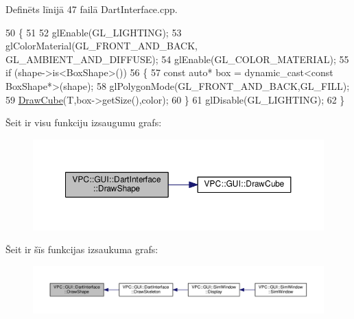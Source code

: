 Definēts līnijā 47 failā Dart\+Interface.\+cpp.


\begin{DoxyCode}
50 \{
51 
52     glEnable(GL\_LIGHTING);
53     glColorMaterial(GL\_FRONT\_AND\_BACK, GL\_AMBIENT\_AND\_DIFFUSE);
54     glEnable(GL\_COLOR\_MATERIAL);
55     \textcolor{keywordflow}{if} (shape->is<BoxShape>())
56     \{
57         \textcolor{keyword}{const} \textcolor{keyword}{auto}* box = \textcolor{keyword}{dynamic\_cast<}\textcolor{keyword}{const }BoxShape*\textcolor{keyword}{>}(shape);
58         glPolygonMode(GL\_FRONT\_AND\_BACK,GL\_FILL);
59         \hyperlink{namespace_v_p_c_1_1_g_u_i_a3ab06821c73e252bb864f2e9c9a6e916}{DrawCube}(T,box->getSize(),color);
60     \}
61     glDisable(GL\_LIGHTING);
62 \}
\end{DoxyCode}


Šeit ir visu funkciju izsaugumu grafs\+:
\nopagebreak
\begin{figure}[H]
\begin{center}
\leavevmode
\includegraphics[width=350pt]{namespace_v_p_c_1_1_g_u_i_1_1_dart_interface_a81b02a78bdeb3f5bdd750d8357f6f426_cgraph}
\end{center}
\end{figure}




Šeit ir šīs funkcijas izsaukuma grafs\+:
\nopagebreak
\begin{figure}[H]
\begin{center}
\leavevmode
\includegraphics[width=350pt]{namespace_v_p_c_1_1_g_u_i_1_1_dart_interface_a81b02a78bdeb3f5bdd750d8357f6f426_icgraph}
\end{center}
\end{figure}



